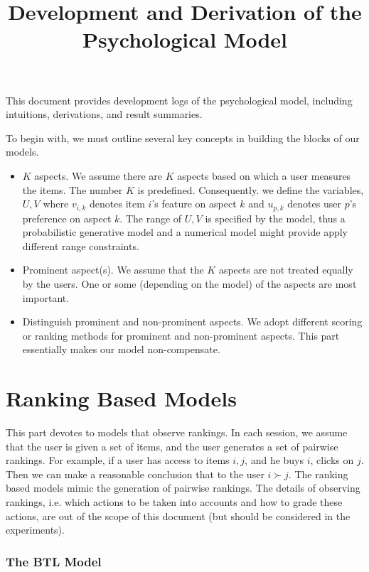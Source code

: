 \documentclass[11pt]{report}
\begin{document}
\title{Development and Derivation of the Psychological Model}
\maketitle

This document provides development logs of the psychological model, including intuitions, derivations, and result summaries.

To begin with, we must outline several key concepts in building the blocks of our models. 
\begin{itemize}
\item $K$ aspects. We assume there are $K$ aspects based on which a user measures the items. The number $K$ is predefined. Consequently. we define the variables, $U,V$ where  $v_{i,k}$ denotes item $i$'s feature on aspect $k$ and $u_{p,k}$  denotes user $p$'s preference on aspect $k$. The range of $U,V$ is specified by the model, thus a probabilistic generative model and a numerical model might provide apply different range constraints.
\item Prominent aspect(s). We assume that the $K$ aspects are not treated equally by the users. One or some (depending on the model) of the aspects are most important. 
\item Distinguish prominent and non-prominent aspects. We adopt different scoring or ranking methods for prominent and non-prominent aspects. This part essentially makes our model non-compensate.   
\end{itemize}

\part{Ranking Based Models}
This part devotes to models that observe rankings. In each session, we assume that the user is given a set of items, and the user generates a set of pairwise rankings. For example, if a user has access to items $i,j$, and he buys $i$, clicks on $j$. Then we can make a reasonable conclusion that to the user $i\succ j$. The ranking based models mimic the generation of pairwise rankings. The details of observing rankings, i.e. which actions to be taken into accounts and how to grade these actions, are out of the scope of this document (but should be considered in the experiments).

\section{The BTL Model}
\end{document}
